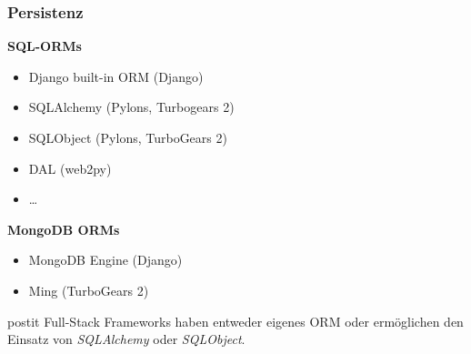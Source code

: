 \documentclass[
    t,
    smaller,
    compress,
    xcolor=svgnames,            %
    table,
]{beamer}
\newenvironment{beamerpostit}[1]%
{\begin{beamercolorbox}[wd=\textwidth,sep=2pt,rounded=true,shadow=true]{postit} #1}%
{\end{beamercolorbox}}%
\begin{document}
%
%





\begin{frame}
  \frametitle{Persistenz}

    \textbf{SQL-ORMs}
    \begin{itemize}[<1->]
        \item Django built-in ORM (Django)
        \item SQLAlchemy (Pylons, Turbogears 2) %
        \item SQLObject (Pylons, TurboGears 2)
        \item DAL (web2py)
        \item \dots
     \end{itemize}
     \textbf{MongoDB ORMs}
    \begin{itemize}[<1->]
        \item MongoDB Engine (Django)
        \item Ming (TurboGears 2)
    \end{itemize}

  \vspace{12pt}
  \begin{beamerpostit}
     Full-Stack Frameworks haben entweder eigenes ORM oder ermöglichen den Einsatz von \textit{SQLAlchemy} oder \textit{SQLObject}.
  \end{beamerpostit}

\end{frame}
\end{document}
